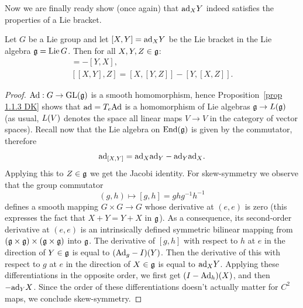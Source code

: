 Now we are finally ready show (once again) that $\mathrm{ad}_X Y$ indeed satisfies the properties of a Lie bracket.

\begin{thm}
    Let $G$ be a Lie group and let $[X,Y]=\mathrm{ad}_X Y$ be the Lie bracket in the Lie algebra $\mathfrak{g}=\operatorname{Lie} G$. Then for all $X,Y,Z\in\mathfrak{g}$:
    \begin{gather}
        [X,Y]=-[Y,X],\\
        [[X,Y],Z]=[X,[Y,Z]]-[Y,[X,Z]].
    \end{gather}
\end{thm}
\begin{proof}
    $\mathrm{Ad}:G\to \operatorname{GL}(\mathfrak{g})$ is a smooth homomorphism, hence Proposition~\ref{prop 1.1.3 DK} shows that $\mathrm{ad}=T_e\mathrm{Ad}$ is a homomorphism of Lie algebras $\mathfrak{g}\to \boldsymbol{\mathrm{\mathrm}}{L}(\mathfrak{g})$ (as usual, $\boldsymbol{\mathrm{\mathrm}}{L}(V)$ denotes the space all linear maps $V\to V$ in the category of vector spaces). Recall now that the Lie algebra on $\operatorname{End}(\mathfrak{g})$ is given by the commutator, therefore
    \[\mathrm{ad}_{[X,Y]}=\mathrm{ad}_X \mathrm{ad}_Y-\mathrm{ad}_Y \mathrm{ad}_X.\]
    Applying this to $Z\in\mathfrak{g}$ we get the Jacobi identity. For skew-symmetry we observe that the group commutator 
    \[(g,h)\mapsto [g,h]=ghg^{-1}h^{-1}\]
    defines a smooth mapping $G\times G\to G$ whose derivative at $(e,e)$ is zero (this expresses the fact that $X+Y=Y+X$ in $\mathfrak{g}$). As a consequence, its second-order derivative at $(e,e)$ is an intrinsically defined symmetric bilinear mapping from $(\mathfrak{g}\times\mathfrak{g})\times(\mathfrak{g}\times\mathfrak{g})$ into $\mathfrak{g}$. The derivative of $[g,h]$ with respect to $h$ at $e$ in the direction of $Y\in\mathfrak{g}$ is equal to $(\mathrm{Ad}_g-I)(Y)$. Then the derivative of this with respect to $g$ at $e$ in the direction of $X\in\mathfrak{g}$ is equal to $\mathrm{ad}_X Y$. Applying these differentiations in the opposite order, we first get $(I-\mathrm{Ad}_h)(X)$, and then $-\mathrm{ad}_Y X$. Since the order of these differentiations doesn't actually matter for $C^2$ maps, we conclude skew-symmetry.
\end{proof}


